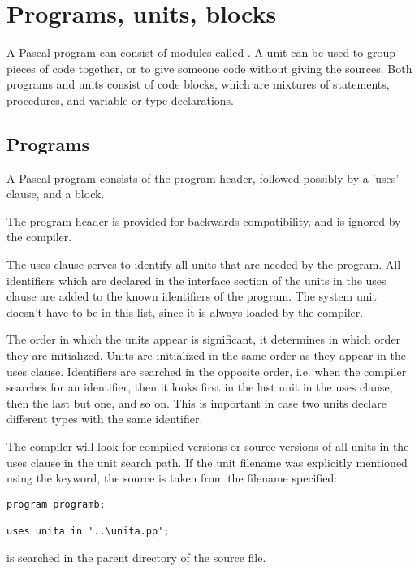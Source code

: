 
\chapter{Programs, units, blocks}
A Pascal program can consist of modules called . A unit can be used
to group pieces of code together, or to give someone code without giving
the sources.
Both programs and units consist of code blocks, which are mixtures of
statements, procedures, and variable or type declarations.

\section{Programs}
A Pascal program consists of the program header, followed possibly by a
'uses' clause, and a block.

The program header is provided for backwards compatibility, and is ignored
by the compiler.

The uses clause serves to identify all units that are needed by the program.
All identifiers which are declared in the interface section of the units
in the uses clause are added to the known identifiers of the program.
The system unit doesn't have to be in this list, since it is always loaded
by the compiler.

The order in which the units appear is significant, it determines in
which order they are initialized. Units are initialized in the same order
as they appear in the uses clause. Identifiers are searched in the opposite
order, i.e. when the compiler searches for an identifier, then it looks
first in the last unit in the uses clause, then the last but one, and so on.
This is important in case two units declare different types with the same
identifier.

The compiler will look for compiled versions or source versions of all 
units in the uses clause in the unit search path. If the unit filename was
explicitly mentioned using the  keyword, the source is taken from
the filename specified:
\begin{verbatim}
program programb;

uses unita in '..\unita.pp';
\end{verbatim}
 is searched in the parent directory of the  source
file.


